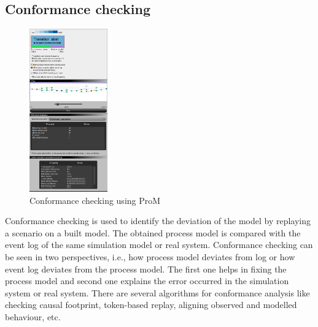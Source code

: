 \begin{bibunit}
   \subsection{Conformance checking}
   
   \begin{figure}[!t]
	   \centering
	   \includegraphics[width=0.3\textwidth]{MX_Papers/Paper5/images/stat1.PNG}
	   \caption{Conformance checking using ProM}
	   \label{fig:stat}
   \end{figure}
   
   
   Conformance checking is used to identify the deviation of the model by replaying a scenario on a built model. The obtained process model is compared with the event log of the same simulation model or real system. Conformance checking can be seen in two perspectives, i.e., how process model deviates from log or how event log deviates from the process model. The first one helps in fixing the process model and second one explains the error occurred in the simulation system or real system. There are several algorithms for conformance analysis like checking causal footprint, token-based replay, aligning observed and modelled behaviour, etc.
   

\end{bibunit}
